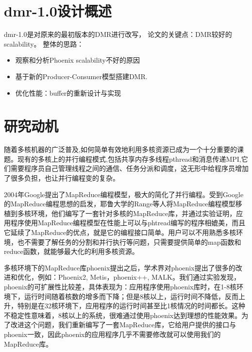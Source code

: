 \section{dmr-1.0设计概述}
dmr-1.0是对原来的最初版本的DMR进行改写，
论文的关键点：DMR较好的scalability。
整体的思路：
\begin{itemize}
  \item 观察和分析Phoenix scalability不好的原因
  \item 基于新的Producer-Consumer模型搭建DMR.
  \item 优化性能：buffer的重新设计与实现
\end{itemize}


\section{研究动机}
随着多核机器的广泛普及,如何简单有效地利用多核资源已成为一个十分重要的课题。现有的多核上的并行编程模式,包括共享内存多线程pthread和消息传递MPI,它们需要程序员自己管理线程之间的通信、任务分派和调度，这无形中给程序员增加了很多负担，也让并行编程变的复杂。

2004年Google提出了MapReduce编程模型，极大的简化了并行编程。受到Google的MapReduce编程思想的启发，耶鲁大学的Range等人将MapReduce编程模型移植到多核环境，他们编写了一套针对多核的MapReduce库，并通过实验证明，应用程序使用MapReduce编程模型在性能上可以与phtread编写的程序相媲美，而且它延续了MapReduce的优点，就是它的编程接口简单。用户可以不用熟悉多核环境，也不需要了解任务的分割和并行执行等问题，只需要提供简单的map函数和reduce函数，就能够最大化的利用多核资源。

多核环境下的MapReduce库phoenix提出之后，学术界对phoenix提出了很多的改进和优化，例如：Phoenix2, Metis，phoenix++, MALK。我们通过实验发现，phoenix的可扩展性比较差，具体表现为：应用程序使用phoenix库时，在1-8核环境下，运行时间随着核数的增多而下降；但是8核以上，运行时间不降低，反而上升，特别是在32核环境下，应用程序的运行时间甚至比1核情况的时间都长。这种不稳定性意味着，8核以上的系统，很难通过使用phoenix达到理想的性能效果。为了改进这个问题，我们重新编写了一套MapReduce库，它给用户提供的接口与phoenix一致，因此phoenix的应用程序几乎不需要修改就可以使用我们的MapReduce库。
